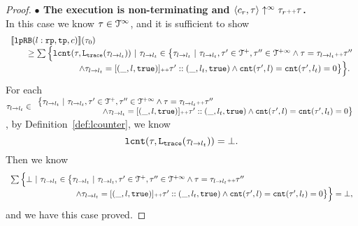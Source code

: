 \begin{proof}
\textbf{$\bullet$ The execution is non-terminating and {$\langle {c_r}, \mathtt{\tau} \rangle \uparrow^{\infty} \mathtt{\tau}_r {\scriptscriptstyle ++} \mathtt{\tau}$}.} 
\\
 In this case we know $\mathtt{\tau} \in \mathcal{T}^{\infty}$, and it is sufficient to show
\\
\[
  \begin{array}{l}
    \llbracket \mathtt{lpRB}(l: \mathtt{rp}, \mathtt{tp}, c) \rrbracket(\mathtt{\tau}_0) 
    \\ \qquad \geq 
      \sum\Big\{
      \mathtt{lcnt}(\mathtt{\tau}, \mathtt{L}_{\mathtt{{trace}}}(\mathtt{\tau}_{l \to l_t})) ~\vert~ \mathtt{\tau}_{l \to l_t} \in 
      \big\{\mathtt{\tau}_{l \to l_t} ~\vert~ 
      \mathtt{\tau}_{l \to l_t}, \mathtt{\tau}' \in \mathcal{T}^{+}, \mathtt{\tau}'' \in \mathcal{T}^{+\infty}
      \land \mathtt{\tau} = \mathtt{\tau}_{l \to l_t} {\scriptscriptstyle ++} \mathtt{\tau}''
      \\ \qquad \qquad \qquad \qquad
      \land \mathtt{\tau}_{l \to l_t} = [(\_, l, \mathtt{true})] {\scriptscriptstyle ++} \mathtt{\tau}' :: (\_, l_t, \mathtt{true})
      \land \mathtt{cnt}(\mathtt{\tau}', l) = \mathtt{cnt}(\mathtt{\tau}', l_t) = 0 
      \big\}
      \Big\}.
  \end{array}
\]
For each 
$\mathtt{\tau}_{l \to l_t} \in
\begin{array}{l}
    \big\{\mathtt{\tau}_{l \to l_t} ~\vert~ 
    \mathtt{\tau}_{l \to l_t}, \mathtt{\tau}' \in \mathcal{T}^{+}, \mathtt{\tau}'' \in \mathcal{T}^{+\infty}
    \land \mathtt{\tau} = \mathtt{\tau}_{l \to l_t} {\scriptscriptstyle ++} \mathtt{\tau}''
    \\ \qquad \qquad \qquad \qquad
    \land \mathtt{\tau}_{l \to l_t} = [(\_, l, \mathtt{true})] {\scriptscriptstyle ++} \mathtt{\tau}' :: (\_, l_t, \mathtt{true})
    \land \mathtt{cnt}(\mathtt{\tau}', l) = \mathtt{cnt}(\mathtt{\tau}', l_t) = 0 
    \big\}
\end{array}
$, by Definition~\ref{def:lcounter}, we know 
\[
  \mathtt{lcnt}(\mathtt{\tau}, \mathtt{L}_{\mathtt{{trace}}}(\mathtt{\tau}_{l \to l_t})) = \bot.
\]
Then we know
\[
  \begin{array}{l}
      \sum\Big\{ \bot ~\vert~ \mathtt{\tau}_{l \to l_t} \in 
      \big\{\mathtt{\tau}_{l \to l_t} ~\vert~ 
      \mathtt{\tau}_{l \to l_t}, \mathtt{\tau}' \in \mathcal{T}^{+}, \mathtt{\tau}'' \in \mathcal{T}^{+\infty}
      \land \mathtt{\tau} = \mathtt{\tau}_{l \to l_t} {\scriptscriptstyle ++} \mathtt{\tau}''
      \\ \qquad \qquad \qquad \qquad
      \land \mathtt{\tau}_{l \to l_t} = [(\_, l, \mathtt{true})] {\scriptscriptstyle ++} \mathtt{\tau}' :: (\_, l_t, \mathtt{true})
      \land \mathtt{cnt}(\mathtt{\tau}', l) = \mathtt{cnt}(\mathtt{\tau}', l_t) = 0 
      \big\}
      \Big\} = \bot,
  \end{array}
  \]
and we have this case proved.
\end{proof}